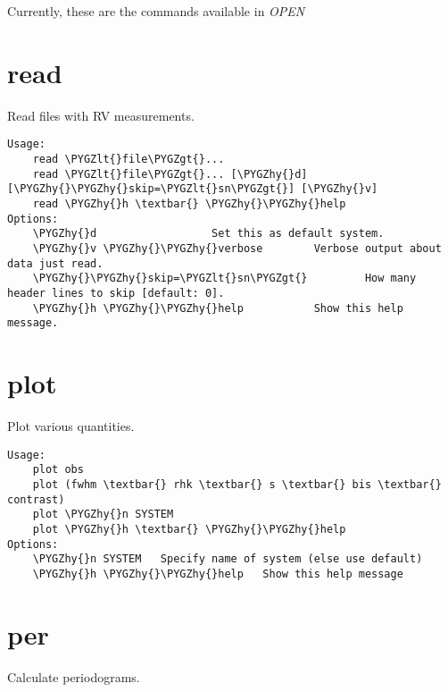 \documentclass[letterpaper,10pt,english]{sphinxmanual}
\def\PYGZlt{\char`\<}
\def\PYGZgt{\char`\>}
\def\PYGZhy{\char`\-}
\begin{document}
Currently, these are the commands available in \emph{OPEN}


\section{read}
\label{commands:read}
Read files with RV measurements.

\begin{Verbatim}[commandchars=\\\{\}]
Usage:
    read \PYGZlt{}file\PYGZgt{}...
    read \PYGZlt{}file\PYGZgt{}... [\PYGZhy{}d] [\PYGZhy{}\PYGZhy{}skip=\PYGZlt{}sn\PYGZgt{}] [\PYGZhy{}v]
    read \PYGZhy{}h \textbar{} \PYGZhy{}\PYGZhy{}help
Options:
    \PYGZhy{}d                  Set this as default system.
    \PYGZhy{}v \PYGZhy{}\PYGZhy{}verbose        Verbose output about data just read.
    \PYGZhy{}\PYGZhy{}skip=\PYGZlt{}sn\PYGZgt{}         How many header lines to skip [default: 0].
    \PYGZhy{}h \PYGZhy{}\PYGZhy{}help           Show this help message.
\end{Verbatim}


\section{plot}
\label{commands:plot}
Plot various quantities.

\begin{Verbatim}[commandchars=\\\{\}]
Usage:
    plot obs
    plot (fwhm \textbar{} rhk \textbar{} s \textbar{} bis \textbar{} contrast)
    plot \PYGZhy{}n SYSTEM
    plot \PYGZhy{}h \textbar{} \PYGZhy{}\PYGZhy{}help
Options:
    \PYGZhy{}n SYSTEM   Specify name of system (else use default)
    \PYGZhy{}h \PYGZhy{}\PYGZhy{}help   Show this help message
\end{Verbatim}


\section{per}
\label{commands:per}
Calculate periodograms.
\end{document}
